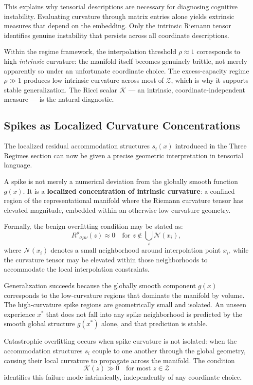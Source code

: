 \documentclass[12pt,a4paper]{article}
\begin{document}
This explains why tensorial descriptions are necessary for diagnosing cognitive instability. Evaluating curvature through matrix entries alone yields extrinsic measures that depend on the embedding. Only the intrinsic Riemann tensor identifies genuine instability that persists across all coordinate descriptions.

Within the regime framework, the interpolation threshold $\rho \approx 1$ corresponds to high \textit{intrinsic} curvature: the manifold itself becomes genuinely brittle, not merely apparently so under an unfortunate coordinate choice. The excess-capacity regime $\rho \gg 1$ produces low intrinsic curvature across most of $\mathcal{Z}$, which is why it supports stable generalization. The Ricci scalar $\mathcal{K}$ --- an intrinsic, coordinate-independent measure --- is the natural diagnostic.

\subsection{Spikes as Localized Curvature Concentrations}

The localized residual accommodation structures $s_i(x)$ introduced in the Three Regimes section can now be given a precise geometric interpretation in tensorial language.

A spike is not merely a numerical deviation from the globally smooth function $g(x)$. It is a \textbf{localized concentration of intrinsic curvature}: a confined region of the representational manifold where the Riemann curvature tensor has elevated magnitude, embedded within an otherwise low-curvature geometry.

Formally, the benign overfitting condition may be stated as:
\[
R^\rho{}_{\sigma\mu\nu}(z) \approx 0 \quad \text{for } z \notin \bigcup_i \mathcal{N}(x_i),
\]
where $\mathcal{N}(x_i)$ denotes a small neighborhood around interpolation point $x_i$, while the curvature tensor may be elevated within those neighborhoods to accommodate the local interpolation constraints.

Generalization succeeds because the globally smooth component $g(x)$ corresponds to the low-curvature regions that dominate the manifold by volume. The high-curvature spike regions are geometrically small and isolated. An unseen experience $x^*$ that does not fall into any spike neighborhood is predicted by the smooth global structure $g(x^*)$ alone, and that prediction is stable.

Catastrophic overfitting occurs when spike curvature is not isolated: when the accommodation structures $s_i$ couple to one another through the global geometry, causing their local curvature to propagate across the manifold. The condition
\[
\mathcal{K}(z) \gg 0 \quad \text{for most } z \in \mathcal{Z}
\]
identifies this failure mode intrinsically, independently of any coordinate choice.
\end{document}
